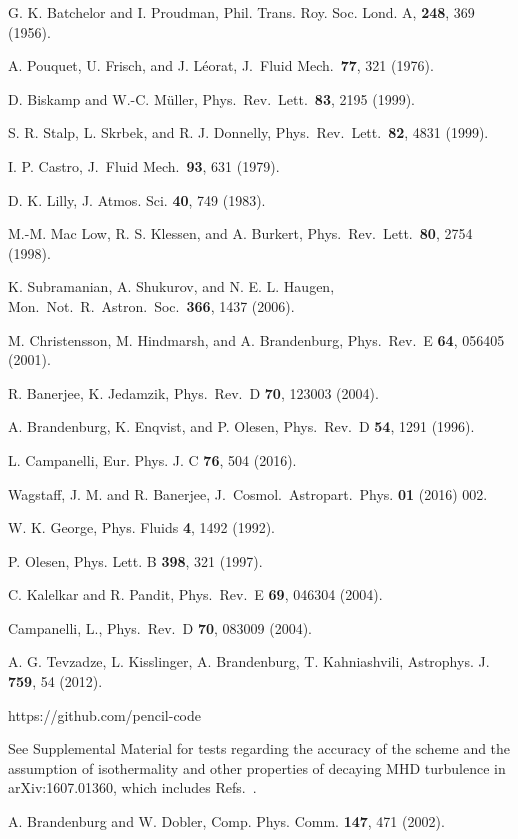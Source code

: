 \documentclass[prl,twocolumn,aps,psfig,showpacs,nofootinbib,nobibnotes,superscriptaddress,preprintnumbers,times]{revtex4}
\newcommand{\yjcap}[3]{, J.\ Cosmol.\ Astropart.\ Phys. {\bf #2} (#1) #3.}
\newcommand{\yprd}[3]{, Phys.\ Rev.\ D {\bf #2}, #3 (#1).}
\newcommand{\ypre}[3]{, Phys.\ Rev.\ E {\bf #2}, #3 (#1).}
\newcommand{\yprl}[3]{, Phys.\ Rev.\ Lett.\ {\bf #2}, #3 (#1).}
\newcommand{\yjfm}[3]{, J.\ Fluid Mech.\ {\bf #2}, #3 (#1).}
\newcommand{\yjour}[4]{, #2 {\bf #3}, #4 (#1).}
\newcommand{\ypf}[3]{, Phys. Fluids {\bf #2}, #3 (#1).}
\newcommand{\yapj}[3]{, Astrophys. J. {\bf #2}, #3 (#1).}
\newcommand{\ymn}[3]{, Mon.\ Not.\ R.\ Astron.\ Soc.\ {\bf #2}, #3 (#1).}
\newcommand{\yptrsa}[3]{, Phil. Trans. Roy. Soc. Lond. A, {\bf #2}, #3 (#1).}
\begin{document}
\begin{thebibliography}{}

G. K. Batchelor and I. Proudman\yptrsa{1956}{248}{369}

A. Pouquet, U. Frisch, and J. L\'eorat\yjfm{1976}{77}{321}

D. Biskamp and W.-C. M\"uller\yprl{1999}{83}{2195}

S. R. Stalp, L. Skrbek, and R. J. Donnelly\yprl{1999}{82}{4831}

I. P. Castro\yjfm{1979}{93}{631}

D. K. Lilly\yjour{1983}{J. Atmos. Sci.}{40}{749}

M.-M. Mac Low, R. S. Klessen, and A. Burkert\yprl{1998}{80}{2754}

K. Subramanian, A. Shukurov, and N. E. L. Haugen\ymn{2006}{366}{1437}

M. Christensson, M. Hindmarsh, and A. Brandenburg\ypre{2001}{64}{056405}

R. Banerjee, K. Jedamzik\yprd{2004}{70}{123003}

A. Brandenburg, K. Enqvist, and P. Olesen\yprd{1996}{54}{1291}

L. Campanelli\yjour{2016}{Eur. Phys. J. C}{76}{504}

Wagstaff, J. M. and R. Banerjee\yjcap{2016}{01}{002}

W. K. George\ypf{1992}{4}{1492}

P. Olesen\yjour{1997}{Phys. Lett. B}{398}{321}

C. Kalelkar and R. Pandit\ypre{2004}{69}{046304}

Campanelli, L.\yprd{2004}{70}{083009}

A. G. Tevzadze, L. Kisslinger, A. Brandenburg, T. Kahniashvili\yapj{2012}{759}{54}

https://github.com/pencil-code

See Supplemental Material for tests regarding the accuracy of
the scheme and the assumption of isothermality and other properties
of decaying MHD turbulence in arXiv:1607.01360, which includes
Refs.~\cite{BD02,Bra03}.

A. Brandenburg and W. Dobler\yjour{2002}{Comp. Phys. Comm.}{147}{471}


\end{thebibliography}
\end{document}

